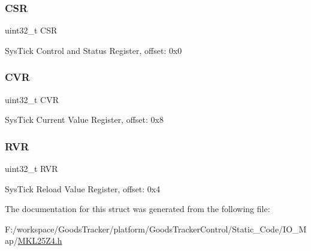 \subsubsection{\texorpdfstring{C\+SR}{CSR}}
{\footnotesize\ttfamily uint32\+\_\+t C\+SR}

Sys\+Tick Control and Status Register, offset\+: 0x0 \mbox{\label{struct_sys_tick___mem_map_a9a64e88c06e0550ec009f2510db2bd58}} 
\subsubsection{\texorpdfstring{C\+VR}{CVR}}
{\footnotesize\ttfamily uint32\+\_\+t C\+VR}

Sys\+Tick Current Value Register, offset\+: 0x8 \mbox{\label{struct_sys_tick___mem_map_a46baf65a2506b0376fe5d5e76576817e}} 
\subsubsection{\texorpdfstring{R\+VR}{RVR}}
{\footnotesize\ttfamily uint32\+\_\+t R\+VR}

Sys\+Tick Reload Value Register, offset\+: 0x4 

The documentation for this struct was generated from the following file\+:\begin{DoxyCompactItemize}
\item 
F\+:/workspace/\+Goods\+Tracker/platform/\+Goods\+Tracker\+Control/\+Static\+\_\+\+Code/\+I\+O\+\_\+\+Map/\hyperlink{_m_k_l25_z4_8h}{M\+K\+L25\+Z4.\+h}\end{DoxyCompactItemize}
